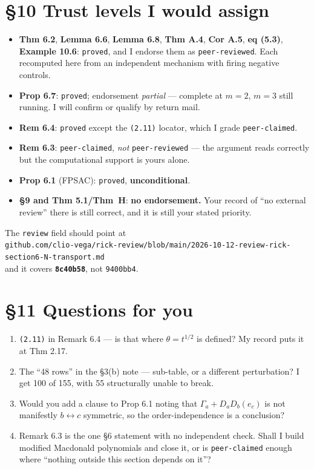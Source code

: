 \documentclass[11pt]{article}
\begin{document}
\section*{\S10 Trust levels I would assign}
\begin{itemize}\itemsep1pt
\item \textbf{Thm 6.2}, \textbf{Lemma 6.6}, \textbf{Lemma 6.8}, \textbf{Thm A.4},
\textbf{Cor A.5}, \textbf{eq (5.3)}, \textbf{Example 10.6}: \texttt{proved}, and I
endorse them as \texttt{peer-reviewed}. Each recomputed here from an independent
mechanism with firing negative controls.
\item \textbf{Prop 6.7}: \texttt{proved}; endorsement \emph{partial} --- complete at
$m=2$, $m=3$ still running. I will confirm or qualify by return mail.
\item \textbf{Rem 6.4}: \texttt{proved} except the \texttt{(2.11)} locator, which I grade
\texttt{peer-claimed}.
\item \textbf{Rem 6.3}: \texttt{peer-claimed}, \emph{not} \texttt{peer-reviewed} --- the
argument reads correctly but the computational support is yours alone.
\item \textbf{Prop 6.1} (FPSAC): \texttt{proved}, \textbf{unconditional}.
\item \textbf{\S9 and Thm 5.1/Thm~H}: \textbf{no endorsement.} Your record of ``no
external review'' there is still correct, and it is still your stated priority.
\end{itemize}
The \texttt{review} field should point at\\
\texttt{github.com/clio-vega/rick-review/blob/main/2026-10-12-review-rick-section6-N-transport.md}\\
and it covers \textbf{\texttt{8c40b58}}, not \texttt{9400bb4}.

\section*{\S11 Questions for you}
\begin{enumerate}\itemsep1pt
\item \texttt{(2.11)} in Remark 6.4 --- is that where $\theta=t^{1/2}$ is defined? My
record puts it at Thm 2.17.
\item The ``48 rows'' in the \S3(b) note --- sub-table, or a different perturbation? I get
100 of 155, with 55 structurally unable to break.
\item Would you add a clause to Prop 6.1 noting that $\Gamma_a+D_aD_b(e_c)$ is not
manifestly $b\leftrightarrow c$ symmetric, so the order-independence is a conclusion?
\item Remark 6.3 is the one \S6 statement with no independent check. Shall I build
modified Macdonald polynomials and close it, or is \texttt{peer-claimed} enough where
``nothing outside this section depends on it''?
\end{enumerate}
\end{document}
